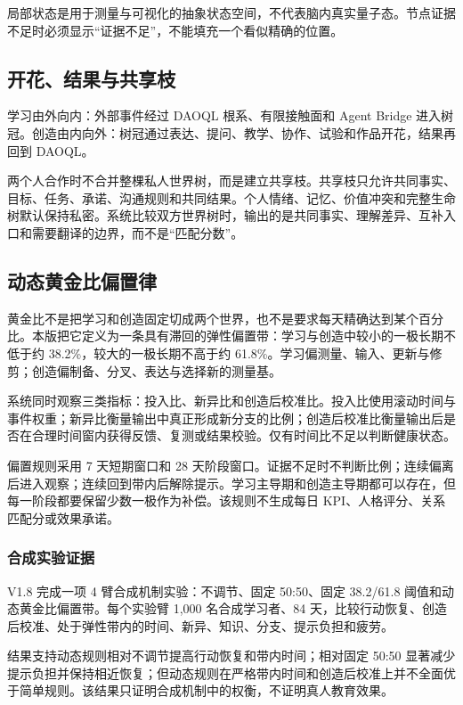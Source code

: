 \documentclass[UTF8,a4paper,11pt]{ctexart}
\begin{document}
局部状态是用于测量与可视化的抽象状态空间，不代表脑内真实量子态。节点证据不足时必须显示“证据不足”，不能填充一个看似精确的位置。

\subsection{开花、结果与共享枝}

学习由外向内：外部事件经过 DAOQL 根系、有限接触面和 Agent Bridge 进入树冠。创造由内向外：树冠通过表达、提问、教学、协作、试验和作品开花，结果再回到 DAOQL。

两个人合作时不合并整棵私人世界树，而是建立共享枝。共享枝只允许共同事实、目标、任务、承诺、沟通规则和共同结果。个人情绪、记忆、价值冲突和完整生命树默认保持私密。系统比较双方世界树时，输出的是共同事实、理解差异、互补入口和需要翻译的边界，而不是“匹配分数”。

\subsection{动态黄金比偏置律}

黄金比不是把学习和创造固定切成两个世界，也不是要求每天精确达到某个百分比。本版把它定义为一条具有滞回的弹性偏置带：学习与创造中较小的一极长期不低于约 38.2\%，较大的一极长期不高于约 61.8\%。学习偏测量、输入、更新与修剪；创造偏制备、分叉、表达与选择新的测量基。

系统同时观察三类指标：投入比、新异比和创造后校准比。投入比使用滚动时间与事件权重；新异比衡量输出中真正形成新分支的比例；创造后校准比衡量输出后是否在合理时间窗内获得反馈、复测或结果校验。仅有时间比不足以判断健康状态。

偏置规则采用 7 天短期窗口和 28 天阶段窗口。证据不足时不判断比例；连续偏离后进入观察；连续回到带内后解除提示。学习主导期和创造主导期都可以存在，但每一阶段都要保留少数一极作为补偿。该规则不生成每日 KPI、人格评分、关系匹配分或效果承诺。

\subsubsection{合成实验证据}

V1.8 完成一项 4 臂合成机制实验：不调节、固定 50:50、固定 38.2/61.8 阈值和动态黄金比偏置带。每个实验臂 1,000 名合成学习者、84 天，比较行动恢复、创造后校准、处于弹性带内的时间、新异、知识、分支、提示负担和疲劳。

结果支持动态规则相对不调节提高行动恢复和带内时间；相对固定 50:50 显著减少提示负担并保持相近恢复；但动态规则在严格带内时间和创造后校准上并不全面优于简单规则。该结果只证明合成机制中的权衡，不证明真人教育效果。
\end{document}
